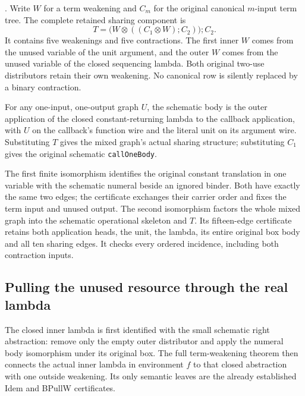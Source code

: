 .
Write $W$ for a term weakening and $C_m$ for the original canonical
$m$-input term tree. The complete retained sharing component is
\[
 T=\bigl(W\otimes((C_1\otimes W);C_2)\bigr);C_2.
\]
It contains five weakenings and five contractions. The first inner $W$
comes from the unused variable of the unit argument, and the outer $W$
comes from the unused variable of the closed sequencing lambda. Both
original two-use distributors retain their own weakening. No canonical
row is silently replaced by a binary contraction.

For any one-input, one-output graph $U$, the schematic body is the outer
application of the closed constant-returning lambda to the callback
application, with $U$ on the callback's function wire and the literal unit
on its argument wire. Substituting $T$ gives the mixed graph's actual
sharing structure; substituting $C_1$ gives the original schematic
\texttt{callOneBody}.

The first finite isomorphism identifies the original constant translation
in one variable with the schematic numeral beside an ignored binder. Both
have exactly the same two edges; the certificate exchanges their carrier
order and fixes the term input and unused output. The second isomorphism
factors the whole mixed graph into the schematic operational skeleton and
$T$. Its fifteen-edge certificate retains both application heads, the unit,
the lambda, its entire original box body and all ten sharing edges. It
checks every ordered incidence, including both contraction inputs.

\subsection{Pulling the unused resource through the real lambda}
The closed inner lambda is first identified with the small schematic right
abstraction: remove only the empty outer distributor and apply the numeral
body isomorphism under its original box. The full term-weakening theorem
then connects the actual inner lambda in environment $f$ to that closed
abstraction with one outside weakening. Its only semantic leaves are the
already established Idem and BPullW certificates.

